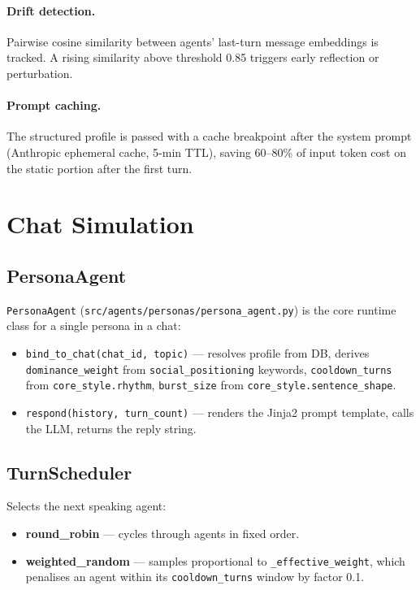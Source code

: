 \documentclass[12pt,a4paper]{article}
\begin{document}
\paragraph{Drift detection.}
Pairwise cosine similarity between agents' last-turn message embeddings is tracked. A
rising similarity above threshold 0.85 triggers early reflection or perturbation.

\paragraph{Prompt caching.}
The structured profile is passed with a cache breakpoint after the system prompt
(Anthropic ephemeral cache, 5-min TTL), saving 60--80\% of input token cost on the
static portion after the first turn.

\section{Chat Simulation}

\subsection{PersonaAgent}

\texttt{PersonaAgent} (\texttt{src/agents/personas/persona\_agent.py}) is the core runtime
class for a single persona in a chat:

\begin{itemize}
  \item \texttt{bind\_to\_chat(chat\_id, topic)} --- resolves profile from DB, derives
        \texttt{dominance\_weight} from \texttt{social\_positioning} keywords,
        \texttt{cooldown\_turns} from \texttt{core\_style.rhythm},
        \texttt{burst\_size} from \texttt{core\_style.sentence\_shape}.
  \item \texttt{respond(history, turn\_count)} --- renders the Jinja2 prompt template,
        calls the LLM, returns the reply string.
\end{itemize}

\subsection{TurnScheduler}

Selects the next speaking agent:
\begin{itemize}
  \item \textbf{round\_robin} --- cycles through agents in fixed order.
  \item \textbf{weighted\_random} --- samples proportional to \texttt{\_effective\_weight},
        which penalises an agent within its \texttt{cooldown\_turns} window by factor 0.1.
\end{itemize}
\end{document}
